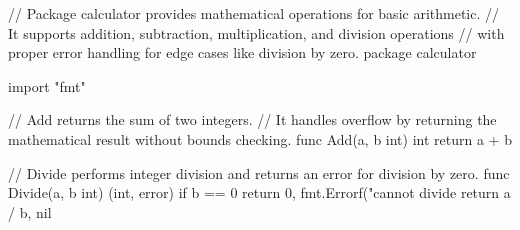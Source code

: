 \documentclass{article}
\begin{document}
\begin{gocode-bad}[title={\textbf{Concurrent Processing Example}}]
// Package calculator provides mathematical operations for basic arithmetic.
// It supports addition, subtraction, multiplication, and division operations
// with proper error handling for edge cases like division by zero.
package calculator

import "fmt"

// Add returns the sum of two integers.
// It handles overflow by returning the mathematical result without bounds checking.
func Add(a, b int) int {
	return a + b
}

// Divide performs integer division and returns an error for division by zero.
func Divide(a, b int) (int, error) {
	if b == 0 {
		return 0, fmt.Errorf("cannot divide %
	}
	return a / b, nil
}
\end{gocode-bad}
\end{document}
